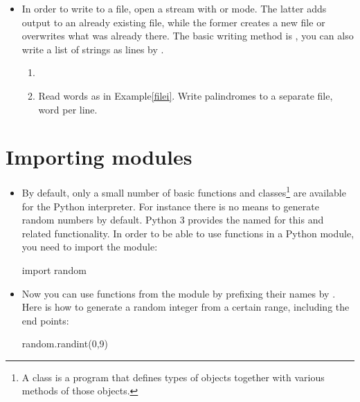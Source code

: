 \documentclass[a4paper]{article}
\begin{document}
{\begin{itemize}
\begin{uexample}
\end{uexample}

\item In order to write to a file, open a stream with 
 or  mode. The latter adds output to an already existing file,
while the former creates a new file or overwrites what was already there. The
basic writing method is , you can also write a list of strings as
lines by .

\begin{uexercise}
\begin{enumerate}
\item[]
\item[] Read words as in Example\ref{filei}. Write palindromes to a separate file,
word per line.
\end{enumerate}
\end{uexercise}


\end{itemize}

\section{Importing modules}

\begin{itemize}

\item By default, only a small number of basic functions and classes\footnote{A
class is a program that defines types of objects together with various methods
of those objects.} are available for the Python interpreter. For instance there
is no means to generate random numbers by default. Python 3 provides the
 named  for this and related functionality. In order
to be able to use functions in a Python module, you need to import the module:

\begin{ucodeframe}
\begin{pyconsole}
import random
\end{pyconsole}
\end{ucodeframe}

\item Now you can use functions from the module by prefixing their names by
. Here is how to generate a random integer from a certain range,
including the end points:

\begin{ucodeframe}
\begin{pyconsole}
random.randint(0,9)
\end{pyconsole}
\end{ucodeframe}


\end{itemize}}
\end{document}

